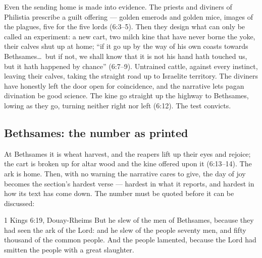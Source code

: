 Even the sending home is made into evidence. The priests and diviners of
Philistia prescribe a guilt offering --- golden emerods and golden mice,
images of the plagues, five for the five lords (6:3--5). Then they design
what can only be called an experiment: a new cart, two milch kine that have
never borne the yoke, their calves shut up at home; ``if it go up by the way
of his own coasts towards Bethsames\ldots\ but if not, we shall know that it
is not his hand hath touched us, but it hath happened by
chance'' (6:7--9).
Untrained cattle, against every instinct, leaving their calves, taking the
straight road up to Israelite territory. The diviners have honestly left
the door open for coincidence, and the narrative lets pagan divination be
good science. The kine go straight up the highway to Bethsames, lowing as
they go, turning neither right nor left (6:12). The test convicts.

\subsection{Bethsames: the number as printed}

At Bethsames it is wheat harvest, and the reapers lift up their eyes and
rejoice; the cart is broken up for altar wood and the kine offered upon it
(6:13--14). The ark is home. Then, with no warning the narrative cares to
give, the day of joy becomes the section's hardest verse --- hardest in
what it reports, and hardest in how its text has come down. The number must
be quoted before it can be discussed:

\begin{witnessbox}{1 Kings 6:19, Douay-Rheims}
But he slew of the men of Bethsames, because they had seen the ark of the
Lord: and he slew of the people seventy men, and fifty thousand of the
common people. And the people lamented, because the Lord had smitten the
people with a great slaughter.
\end{witnessbox}

